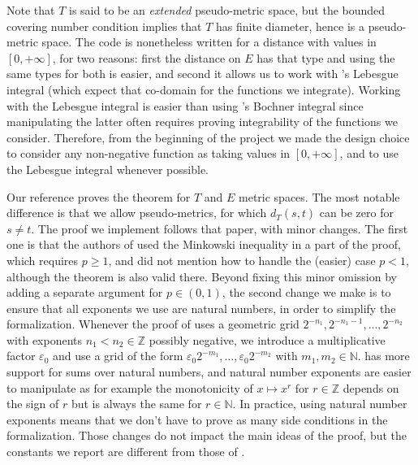 \documentclass[lean]{Draft}
\begin{document}
Note that $T$ is said to be an \emph{extended} pseudo-metric space, but the bounded covering number condition implies that $T$ has finite diameter, hence is a pseudo-metric space.
The \Lean code is nonetheless written for a distance with values in $[0,+\infty]$, for two reasons: first the distance on $E$ has that type and using the same types for both is easier, and second it allows us to work with \mathlib's Lebesgue integral (which expect that co-domain for the functions we integrate).
Working with the Lebesgue integral is easier than using \mathlib's Bochner integral since manipulating the latter often requires proving integrability of the functions we consider.
Therefore, from the beginning of the project we made the design choice to consider any non-negative function as taking values in $[0,+\infty]$, and to use the Lebesgue integral whenever possible.

Our reference \cite{kratschmer2023kolmogorov} proves the theorem for $T$ and $E$ metric spaces.
The most notable difference is that we allow pseudo-metrics, for which $d_T(s, t)$ can be zero for $s \ne t$.
The proof we implement follows that paper, with minor changes.
The first one is that the authors of \cite{kratschmer2023kolmogorov} used the Minkowski inequality in a part of the proof, which requires $p \ge 1$, and did not mention how to handle the (easier) case $p < 1$, although the theorem is also valid there.
Beyond fixing this minor omission by adding a separate argument for $p \in (0,1)$, the second change we make is to ensure that all exponents we use are natural numbers, in order to simplify the formalization.
Whenever the proof of \cite{kratschmer2023kolmogorov} uses a geometric grid $2^{-n_1}, 2^{-n_1-1},\ldots, 2^{-n_2}$ with exponents $n_1 < n_2 \in \mathbb{Z}$ possibly negative, we introduce a multiplicative factor $\varepsilon_0$ and use a grid of the form $\varepsilon_0 2^{-m_1}, \ldots, \varepsilon_0 2^{-m_2}$ with $m_1, m_2 \in \mathbb{N}$.
\mathlib has more support for sums over natural numbers, and natural number exponents are easier to manipulate as for example the monotonicity of $x \mapsto x^r$ for $r \in \mathbb{Z}$ depends on the sign of $r$ but is always the same for $r \in \mathbb{N}$. In practice, using natural number exponents means that we don't have to prove as many side conditions in the formalization.
Those changes do not impact the main ideas of the proof, but the constants we report are different from those of \cite{kratschmer2023kolmogorov}.
\end{document}
